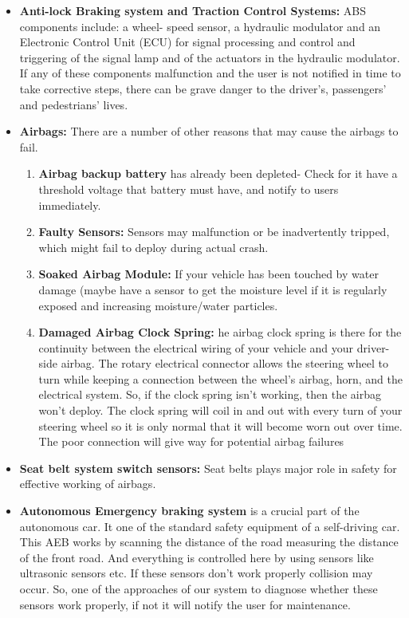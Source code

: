 \label{sec:use-case}
\begin{itemize}
	 \item \textbf{Anti-lock Braking system and Traction Control Systems:} ABS components include: a wheel- speed sensor, a hydraulic modulator and an Electronic Control Unit (ECU) for signal processing and control and triggering of the signal lamp and of the actuators in the hydraulic modulator.
	 If any of these components malfunction and the user is not notified in time to take corrective steps, there can be grave danger to the driver’s, passengers’ and pedestrians’ lives.
	 
	 \item \textbf{Airbags:} There are a number of other reasons that may cause the airbags to fail.
	 \begin{enumerate}
	 	\item \textbf{Airbag backup battery} has already been depleted- Check for it have a threshold voltage that battery must have, and notify to users immediately.
	 	\item \textbf{Faulty Sensors:} Sensors may malfunction or be inadvertently tripped, which might fail to deploy during actual crash.
	 	\item \textbf{Soaked Airbag Module:} If your vehicle has been touched by water damage (maybe have a sensor to get the moisture level if it is regularly exposed and increasing moisture/water particles.
	 	\item \textbf{Damaged Airbag Clock Spring:} he airbag clock spring is there for the continuity between the electrical wiring of your vehicle and your driver-side airbag. The rotary electrical connector allows the steering wheel to turn while keeping a connection between the wheel’s airbag, horn, and the electrical system. So, if the clock spring isn’t working, then the airbag won’t deploy. The clock spring will coil in and out with every turn of your steering wheel so it is only normal that it will become worn out over time. The poor connection will give way for potential airbag failures 
	 \end{enumerate}
	 
	 \item \textbf{Seat belt system switch sensors:} Seat belts plays major role in safety for effective working of airbags.
	 
	 \item \textbf{Autonomous Emergency braking system }is a crucial part of the autonomous car. It one of the standard safety equipment of a self-driving car. This AEB works by scanning the distance of the road measuring the distance of the front road. And everything is controlled here by using sensors like ultrasonic sensors etc. If these sensors don’t work properly collision may occur. So, one of the approaches of our system to diagnose whether these sensors work properly, if not it will notify the user for maintenance.
	 

\end{itemize}
